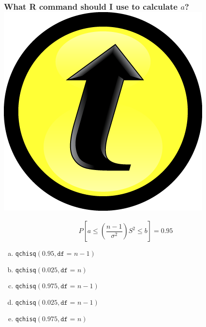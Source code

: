 \documentclass[handout]{beamer}
\begin{document}
\begin{frame}
\frametitle{What R command should I use to calculate $a$? \hfill \includegraphics[scale = 0.05]{./images/clicker}}
$$P\left[ a\leq   \left( \frac{n-1}{\sigma^2}\right)S^2 \leq b \right] = 0.95$$
	\begin{enumerate}[(a)]
		\item \texttt{qchisq}$( 0.95, \texttt{df = } n-1)$
		\item \texttt{qchisq}$( 0.025, \texttt{df = }  n)$
		\item \texttt{qchisq}$(0.975, \texttt{df = }  n-1)$
		\item \texttt{qchisq}$( 0.025, \texttt{df = }  n-1)$
		\item \texttt{qchisq}$(0.975, \texttt{df = }  n)$
	\end{enumerate}
\end{frame}
\end{document}
